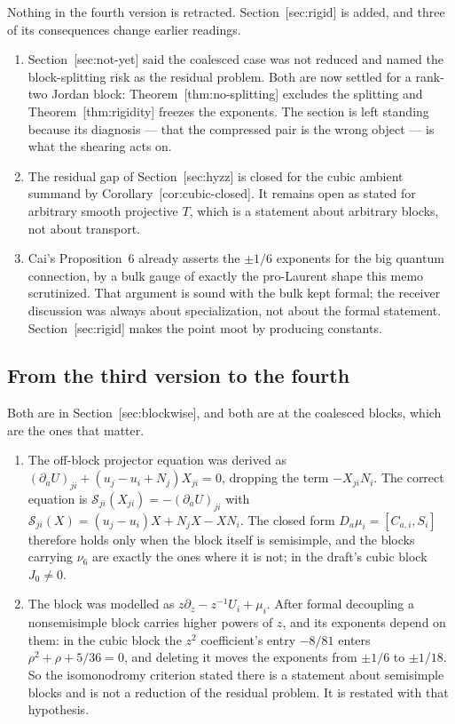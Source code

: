\documentclass[11pt]{article}
\theoremstyle{definition}
\theoremstyle{remark}
\begin{document}
Nothing in the fourth version is retracted. Section~\textup{[sec:rigid]} is added,
and three of its consequences change earlier readings.

\begin{enumerate}
\item Section~\textup{[sec:not-yet]} said the coalesced case was not reduced and
  named the block-splitting risk as the residual problem. Both are now settled
  for a rank-two Jordan block: Theorem~\textup{[thm:no-splitting]} excludes the
  splitting and Theorem~\textup{[thm:rigidity]} freezes the exponents. The section is
  left standing because its diagnosis --- that the compressed pair is the wrong
  object --- is what the shearing acts on.
\item The residual gap of Section~\textup{[sec:hyzz]} is closed for the cubic
  ambient summand by Corollary~\textup{[cor:cubic-closed]}. It remains open as
  stated for arbitrary smooth projective $T$, which is a statement about
  arbitrary blocks, not about transport.
\item Cai's Proposition~6 already asserts the $\pm1/6$ exponents for the big
  quantum connection, by a bulk gauge of exactly the pro-Laurent shape this memo
  scrutinized. That argument is sound with the bulk kept formal; the receiver
  discussion was always about specialization, not about the formal statement.
  Section~\textup{[sec:rigid]} makes the point moot by producing constants.
\end{enumerate}

\subsection*{From the third version to the fourth}

Both are in Section~\textup{[sec:blockwise]}, and both are at the coalesced blocks,
which are the ones that matter.

\begin{enumerate}
\item The off-block projector equation was derived as
  $(\partial_aU)_{ji}+(u_j-u_i+N_j)X_{ji}=0$, dropping the term $-X_{ji}N_i$.
  The correct equation is $\mathcal S_{ji}(X_{ji})=-(\partial_aU)_{ji}$ with
  $\mathcal S_{ji}(X)=(u_j-u_i)X+N_jX-XN_i$. The closed form
  $D_a\mu_i=[C_{a,i},S_i]$ therefore holds only when the block itself is
  semisimple, and the blocks carrying $\nu_6$ are exactly the ones where it is
  not; in the draft's cubic block $J_0\ne0$.
\item The block was modelled as $z\partial_z-z^{-1}U_i+\mu_i$. After formal
  decoupling a nonsemisimple block carries higher powers of $z$, and its
  exponents depend on them: in the cubic block the $z^2$ coefficient's entry
  $-8/81$ enters $\rho^2+\rho+5/36=0$, and deleting it moves the exponents from
  $\pm1/6$ to $\pm1/18$. So the isomonodromy criterion stated there is a
  statement about semisimple blocks and is not a reduction of the residual
  problem. It is restated with that hypothesis.
\end{enumerate}
\end{document}
